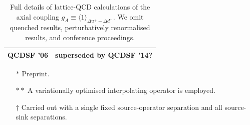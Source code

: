 \begin{table}[t]
{\begin{tabular}{llllll}
  QCDSF '06 \cite{Khan:2006de} &
  \multicolumn{5}{l}{superseded by QCDSF '14?} \\
\hline
\end{tabular}
} %
\begin{minipage}{\linewidth}
{\footnotesize 
\begin{itemize}
\item[$*$] Preprint.
\item[$**$] A variationally optimised interpolating operator is employed.
\item[$\dagger$] Carried out with a single fixed source-operator separation and all source-sink separations.
\end{itemize}
}
\end{minipage}
\caption{\small Full details of lattice-QCD calculations of the axial coupling $g_A\equiv\langle 1\rangle_{\Delta u^+-\Delta d^+}$.
We omit quenched results, perturbatively renormalised results, and conference proceedings.}
\label{tab:latticebibfirst}
\end{table}


